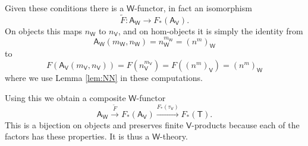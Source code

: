 \documentclass{amsart}
\theoremstyle{definition}
\newtheorem{lemma}[theorem]{Lemma}
\newcommand{\NN}{\mathsf{N}}
\newcommand{\A}{\mathsf{A}}
\newcommand{\V}{\mathsf{V}}
\newcommand{\W}{\mathsf{W}}
\newcommand{\D}{\mathsf{D}}
\newcommand{\C}{\mathsf{C}}
\newcommand{\T}{\mathsf{T}}
\newcommand{\maps}{\colon}
\begin{document}
Given these conditions there is a $\W$-functor, in fact an isomorphism
\[    \tilde{F} \maps \A_\W \to F_*(\A_\V)  . \]
On objects this maps $n_\W$ to $n_\V$, and on hom-objects it is simply the identity from
\[     \A_\W(m_\W, n_\W) = n_\W^{m_\W} = (n^m)_\W \]
to 
\[    F(\A_\V(m_\V, n_\V)) = F(n_\V^{m_\V}) = F((n^m)_\V) = (n^m)_\W \]
where we use Lemma \ref{lem:NN} in these computations.

Using this we obtain a composite $\W$-functor
\[   \A_\W \stackrel{\tilde{F}}{\longrightarrow} 
  F_*(\A_\V) \stackrel{F_*(\tau_\V)}{\longrightarrow} F_*(\T). \]
This is a bijection on objects and preserves finite $\V$-products because each of the factors
has these properties.   It is thus a $\W$-theory.

\end{document}
